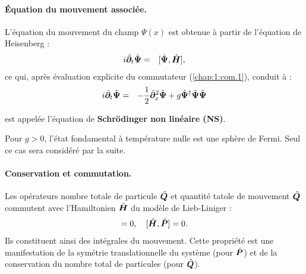 



\paragraph{Équation du mouvement associée.}

L’équation du mouvement du champ \( \Psi(x) \) est obtenue à partir de l’équation de Heisenberg :
\begin{eqnarray}
	i\hat{\bm{\partial}}_t	\hat{\bm{\Psi}} & = & [ \hat{\bm{\Psi}} , \hat{\bm{H}} ],
\end{eqnarray}
ce qui, après évaluation explicite du commutateur (\ref{chap:1:com.1}), conduit à :
\begin{eqnarray}
	i \hat{\bm{\partial}}_t \hat{\bm{\Psi}}	 & = & - \frac{1}{2}\hat{\bm{\partial}}_x^2 \hat{\bm{\Psi}} + g \hat{\bm{\Psi}}^\dag\hat{\bm{\Psi}} \hat{\bm{\Psi}}
\end{eqnarray}

est appelée l'équation de \textbf{Schrödinger non linéaire (NS)}.

Pour $g > 0$, l'état fondamental à température nulle est une sphère de Fermi. Seul ce cas sera considéré par la suite.


\paragraph{Conservation et commutation.}
Les opérateurs nombre totale de particule $\hat{\bm{Q}}$ et quantité tatole de mouvement  $\hat{\bm{Q}}$  commutent avec l’Hamiltonien $\hat{\bm{H}}$ du modèle de Lieb-Liniger :
\begin{eqnarray}
[ \operator{H} , \operator{Q} ] = 0, \quad [ \operator{H} , \operator{P} ] = 0.
\end{eqnarray}
Ils constituent ainsi des intégrales du mouvement. Cette propriété est une manifestation de la symétrie translationnelle du système (pour $\hat{\bm{P}}$) et de la conservation du nombre total de particules (pour $\hat{\bm{Q}}$).

